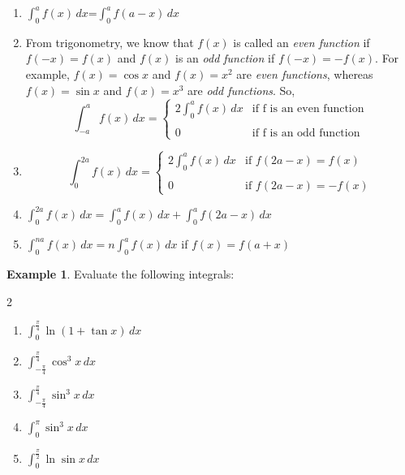 \documentclass{book}
\theoremstyle{definition}
\newtheorem{example}{Example}[section]
\begin{document}
\begin{enumerate}[
    label=\textbf{Property \Roman*.}, 
    ref=\textbf{Property \Roman*},
    leftmargin=*,
    align=left
]
\item $\displaystyle\int _0^a f(x)\,dx$=$\displaystyle\int _0^a f(a-x)\,dx$ \label{prop:first}

\item From trigonometry, we know that $f(x)$ is called an \textit{even function} if $f(-x)=f(x)$ and $f(x)$ is an \textit{odd function} if $f(-x)=-f(x)$. For example, $f(x)=\cos x$ and $f(x)=x^2$ are \textit{even functions}, whereas $f(x)=\sin x$ and $f(x)=x^3$ are \textit{odd functions}. So,
\begin{equation*}
\displaystyle\int_{-a}^a f(x)\,dx= 
\begin{cases}
    2\displaystyle\int_0^a f(x)\,dx     & \text{if f is an even function} \\\\
     0   & \text{if f is an odd function}
\end{cases}    
\end{equation*} \label{prop:second}

\item \begin{equation*}
\displaystyle\int_0^{2a} f(x)\,dx= 
\begin{cases}
    2\displaystyle\int_0^a f(x)\,dx     & \text{if   } f(2a-x)=f(x)     \\\\
    0    & \text{if   }   f(2a-x)=-f(x)
\end{cases}    
\end{equation*} \label{prop:third}

\item $\displaystyle\int_0^{2a} f(x)\,dx = \displaystyle\int_0^a f(x)\,dx + \displaystyle\int_0^a f(2a-x)\,dx$ \label{prop:fourth}

\item $\displaystyle\int_0^{na} f(x)\,dx = n\displaystyle\int_0^a f(x)\,dx$ if $f(x)=f(a+x)$ \label{prop:fifth}
\end{enumerate}



\begin{example}
Evaluate the following integrals:
\begin{multicols}{2}
\begin{enumerate}[label=(\roman*)]
    \item $\displaystyle\int_0^{\frac{\pi}{4}}\ln(1+\tan x)\,dx$
    \item $\displaystyle\int_{-\frac{\pi}{4}}^{\frac{\pi}{4}}\cos^3 x\,dx$
    \item $\displaystyle\int_{-\frac{\pi}{4}}^{\frac{\pi}{4}}\sin^3 x\,dx$
    \item $\displaystyle\int_0^{\pi}\sin^3 x\,dx$
    \item $\displaystyle\int_0^{\frac{\pi}{2}}\ln \sin x\,dx$
\end{enumerate}
\end{multicols}
\end{example}
\end{document}
